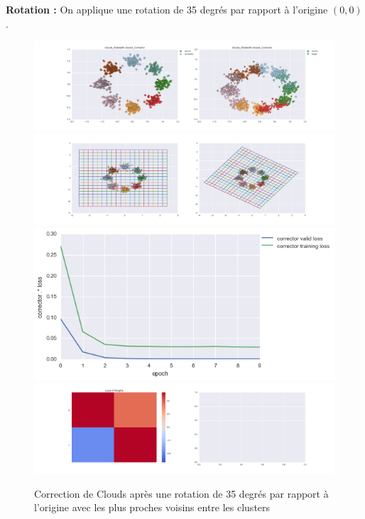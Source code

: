 
{\Large \textbf{Rotation :}} On applique une rotation de 35 degrés par rapport à l'origine $(0,0)$.

\begin{figure}[H] %
\centering
\includegraphics[width=\linewidth]{fig/24-05-2016/clouds/Clouds_RotatedK-closest_Corrector-DATA.png}
\includegraphics[width=\linewidth]{fig/24-05-2016/clouds/Clouds_RotatedK-closest_Corrector-GridCheck.png}
\includegraphics[width=0.45\linewidth]{fig/24-05-2016/clouds/Clouds_RotatedK-closest_Corrector-Learning_curve.png}
\includegraphics[width=\linewidth]{fig/24-05-2016/clouds/Clouds_RotatedK-closest_Corrector-W.png}
\caption{Correction de Clouds après une rotation de 35 degrés par rapport à l'origine avec les plus proches voisins entre les clusters}
\label{fig:recap-clouds-rot-exhaustive}
\end{figure}

